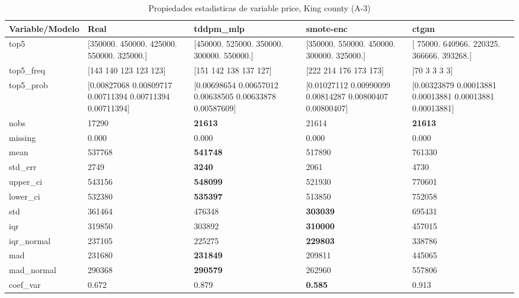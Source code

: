 \begin{table}[H]
\centering
\fontsize{8}{14}\selectfont
\caption{Propiedades  estadisticas de variable price, King county (A-3)}
\label{table-stats-king county-a-3-price}
\begin{tabular}{|l|m{10em}|m{10em}|m{10em}|m{10em}|}
\hline
 \rowcolor[gray]{0.8}
Variable/Modelo & Real & tddpm\_mlp & smote-enc & ctgan \\
\hline top5 & [350000. 450000. 425000. 550000. 325000.] & [450000. 525000. 350000. 300000. 550000.] & [350000. 550000. 450000. 300000. 325000.] & [ 75000. 640966. 220325. 366666. 393268.] \\
\hline top5\_freq & [143 140 123 123 123] & [151 142 138 137 127] & [222 214 176 173 173] & [70  3  3  3  3] \\
\hline top5\_prob & [0.00827068 0.00809717 0.00711394 0.00711394 0.00711394] & [0.00698654 0.00657012 0.00638505 0.00633878 0.00587609] & [0.01027112 0.00990099 0.00814287 0.00800407 0.00800407] & [0.00323879 0.00013881 0.00013881 0.00013881 0.00013881] \\
\hline nobs & 17290 & \bfseries 21613 & \cellcolor[rgb]{0.9, 0.54, 0.52} 21614 & \bfseries 21613 \\
\hline missing & 0.000 & 0.000 & 0.000 & 0.000 \\
\hline mean & 537768 & \bfseries 541748 & 517890 & \cellcolor[rgb]{0.9, 0.54, 0.52} 761330 \\
\hline std\_err & 2749 & \bfseries 3240 & 2061 & \cellcolor[rgb]{0.9, 0.54, 0.52} 4730 \\
\hline upper\_ci & 543156 & \bfseries 548099 & 521930 & \cellcolor[rgb]{0.9, 0.54, 0.52} 770601 \\
\hline lower\_ci & 532380 & \bfseries 535397 & 513850 & \cellcolor[rgb]{0.9, 0.54, 0.52} 752058 \\
\hline std & 361464 & 476348 & \bfseries 303039 & \cellcolor[rgb]{0.9, 0.54, 0.52} 695431 \\
\hline iqr & 319850 & 303892 & \bfseries 310000 & \cellcolor[rgb]{0.9, 0.54, 0.52} 457015 \\
\hline iqr\_normal & 237105 & 225275 & \bfseries 229803 & \cellcolor[rgb]{0.9, 0.54, 0.52} 338786 \\
\hline mad & 231680 & \bfseries 231849 & 209811 & \cellcolor[rgb]{0.9, 0.54, 0.52} 445065 \\
\hline mad\_normal & 290368 & \bfseries 290579 & 262960 & \cellcolor[rgb]{0.9, 0.54, 0.52} 557806 \\
\hline coef\_var & 0.672 & 0.879 & \bfseries 0.585 & \cellcolor[rgb]{0.9, 0.54, 0.52} 0.913 \\

\end{tabular}
\end{table}
